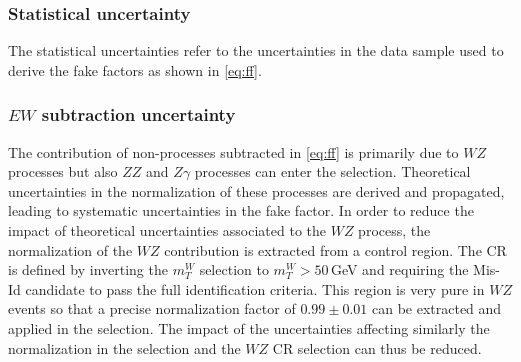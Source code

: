     \subsubsection{Statistical uncertainty}
    The statistical uncertainties refer to the uncertainties in the data sample used to derive the fake factors as shown in \cref{eq:ff}.

    \subsubsection{$EW$ subtraction uncertainty}
    The contribution of non-\Zjets processes subtracted in \cref{eq:ff} is primarily due to $WZ$ processes but also $ZZ$ and $Z\gamma$ processes can enter the \Zjets selection.
    Theoretical uncertainties in the normalization of these processes are derived and propagated, leading to systematic uncertainties in the fake factor.
    In order to reduce the impact of theoretical uncertainties associated to the $WZ$ process, the normalization of the $WZ$ contribution is extracted from a control region. The CR is defined by inverting the $m_T^W$ selection to $m_T^W > 50\,$GeV and requiring the Mis-Id candidate to pass the full identification criteria. This region is very pure in $WZ$ events so that a precise normalization factor of $0.99 \pm 0.01$ can be extracted and applied in the \Zjets selection. The impact of the uncertainties affecting similarly the normalization in the \Zjets selection and the $WZ$ CR selection can thus be reduced.


